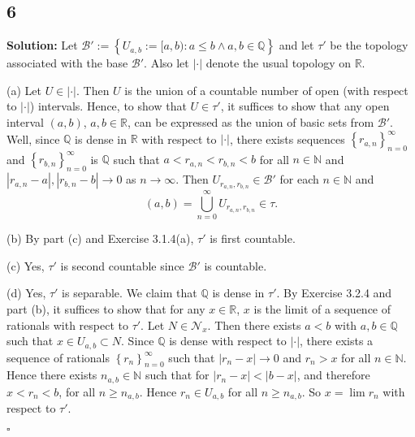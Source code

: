 \documentclass[12pt]{article}
\newcounter{ProofCounter}
\newenvironment{Solution}{\stepcounter{ProofCounter}\textbf{Solution:}}{\hfill$\square$}
\begin{document}
\subsection*{6}
\begin{Solution}
  Let $\mathcal{B}' := \left\{ U_{a,b} := [a,b) : a \leq b \wedge a,b\in \mathbb{Q} \right\}$ and let $\tau'$ be the topology associated with the base 
  $\mathcal{B}'$.
  Also let $|\cdot|$ denote the usual topology on $\mathbb{R}$.

  (a) Let $U \in |\cdot|$. Then $U$ is the union of a countable number of open (with respect to $|\cdot|$) intervals. Hence, to show that $U \in \tau'$, it suffices to show that
  any open interval $(a,b)$, $a,b \in \mathbb{R}$, can be expressed as the union of basic sets from $\mathcal{B}'$. Well, since $\mathbb{Q}$ is dense
  in $\mathbb{R}$ with respect to $|\cdot|$, there exists sequences $\left\{ r_{a,n} \right\}_{n=0}^{\infty}$ and $\left\{ r_{b,n}
  \right\}_{n=0}^{\infty}$ is $\mathbb{Q}$ such that $a < r_{a,n} < r_{b,n} < b$ for all $n \in \mathbb{N}$ and $|r_{a,n} - a|, |r_{b,n} - b|
  \rightarrow 0$ as $n\rightarrow\infty$. Then $U_{r_{a,n},r_{b,n}} \in \mathcal{B}'$ for each $n \in \mathbb{N}$ and 
  \[
    (a,b) = \bigcup_{n=0}^{\infty}U_{r_{a,n},r_{b,n}} \in \tau.
  \]

  (b) By part (c) and Exercise 3.1.4(a), $\tau'$ is first countable.

  (c) Yes, $\tau'$ is second countable since $\mathcal{B}'$ is countable.

  (d) Yes, $\tau'$ is separable. We claim that $\mathbb{Q}$ is dense in $\tau'$. By Exercise 3.2.4 and part (b), it suffices to show that for any $x \in
  \mathbb{R}$, $x$ is the limit of a sequence of rationals with respect to $\tau'$. Let $N \in \mathcal{N}_x$. Then there exists $a < b$ with $a,b \in
  \mathbb{Q}$ such that $x \in U_{a,b} \subset N$.
  Since $\mathbb{Q}$ is dense with respect to $|\cdot|$, there exists a sequence of rationals $\left\{ r_n \right\}_{n=0}^{\infty}$ such that 
  $|r_n - x| \rightarrow 0$ and $r_n > x$ for all $n \in \mathbb{N}$. Hence there exists $n_{a,b} \in\mathbb{N}$ such that for $|r_n - x| < |b - x|$,
  and therefore $x < r_n < b$, for all $n
  \geq n_{a,b}$. Hence $r_n \in U_{a,b}$ for all $n \geq n_{a,b}$. So $x = \lim r_n$ with respect to $\tau'$.

\end{Solution}
\end{document}
